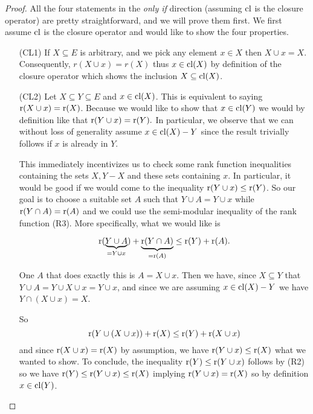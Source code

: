 \begin{proof}
    All the four statements in the \textit{only if} direction (assuming $\mathrm{cl}$ is the closure operator) are pretty straightforward, and we will prove them first. We first assume $\mathrm{cl}$ is the closure operator and would like to show the four properties.

    \begin{enumerate}
        \item[(CL1)] If $X\subseteq E$ is arbitrary, and we pick any element $x \in X$ then $X \cup x = X$. Consequently, $r(X \cup x)= r(X)$ thus $x \in \mathrm{cl}(X)$ by definition of the closure operator which shows the inclusion $X \subseteq \mathrm{cl}(X)$.

        \item[(CL2)] Let $X \subseteq Y \subseteq E$
        and $x \in \mathrm{cl}(X)$. This is equivalent to saying $\operatorname{r}(X \cup x) = \operatorname{r}(X)$. Because we would like to show that $x \in \mathrm{cl}(Y)$ we would by definition like that $\operatorname{r}(Y \cup x) = \operatorname{r}(Y).$ In particular, we observe that we can without loss of generality assume $x \in \mathrm{cl}(X) - Y$ since the result trivially follows if $x$ is already in $Y$. 
        
        This immediately incentivizes us to check some rank function inequalities containing the sets $X, Y - X$ and these sets containing $x.$ In particular, it would be good if we would come to the inequality 
        $\operatorname{r}(Y\cup x) \leq \operatorname{r}(Y)$.
        So our goal is to choose a suitable set $A$ such that $Y \cup A = Y \cup x$ while $\operatorname{r}(Y \cap A) = \operatorname{r}(A)$ and we could use the semi-modular inequality of the rank function (R3). More specifically, what we would like is

        $$\operatorname{r}(\underbrace{Y \cup A}_{ = Y  \cup x}) + \underbrace{\operatorname{r}(Y \cap A)}_{ = \operatorname{r}(A)} \leq \operatorname{r}(Y) + \operatorname{r}(A).$$

        One $A$ that does exactly this is $A = X \cup x.$ Then we have, since $X \subseteq Y$ that $Y \cup A = Y \cup X \cup x = Y \cup x$, and since we are assuming $x \in \mathrm{cl}(X) - Y$ we have $Y \cap (X \cup x) = X $.

        So $$\operatorname{r}(Y\cup (X \cup x)) + \operatorname{r}(X) \leq \operatorname{r}(Y) + \operatorname{r}(X \cup x)$$ and since $\operatorname{r}(X \cup x) = \operatorname{r}(X)$ by assumption, we have 
        $\operatorname{r}(Y \cup x)\leq \operatorname{r}(X)$ what we wanted to show. To conclude, the inequality $\operatorname{r}(Y) \leq \operatorname{r}(Y \cup x)$ follows by (R2) so we have $\operatorname{r}(Y) \leq \operatorname{r}(Y\cup x) \leq \operatorname{r}(X)$ implying $\operatorname{r}(Y \cup x ) = \operatorname{r}(X)$ so by definition $x \in \mathrm{cl}(Y)$.


\end{enumerate}
\end{proof}
